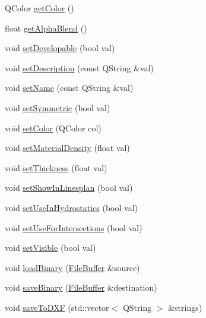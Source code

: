 \begin{DoxyCompactItemize}
Q\-Color \hyperlink{classShipCAD_1_1SubdivisionLayer_a0a4de50721580a29c716e11196239578}{get\-Color} ()
\item 
float \hyperlink{classShipCAD_1_1SubdivisionLayer_a892f5e7c6638537e1a30630fc1a791a2}{get\-Alpha\-Blend} ()
\item 
void \hyperlink{classShipCAD_1_1SubdivisionLayer_a6fdfc0d208904d821349eb7380a52411}{set\-Developable} (bool val)
\item 
void \hyperlink{classShipCAD_1_1SubdivisionLayer_a6ef8702f5488a9c3c3763e8472c9a568}{set\-Description} (const Q\-String \&val)
\item 
void \hyperlink{classShipCAD_1_1SubdivisionLayer_a3861c77aeb283fbea6efe943ced83f41}{set\-Name} (const Q\-String \&val)
\item 
void \hyperlink{classShipCAD_1_1SubdivisionLayer_ab3c7c5072ba6cd411404651e8e0dca2f}{set\-Symmetric} (bool val)
\item 
void \hyperlink{classShipCAD_1_1SubdivisionLayer_a5494031433242c810e6e307bfef33e6d}{set\-Color} (Q\-Color col)
\item 
void \hyperlink{classShipCAD_1_1SubdivisionLayer_ae96292d06a3578f9c7bfbbdec342068a}{set\-Material\-Density} (float val)
\item 
void \hyperlink{classShipCAD_1_1SubdivisionLayer_ac4068bcc8287698ee23e27246de9212b}{set\-Thickness} (float val)
\item 
void \hyperlink{classShipCAD_1_1SubdivisionLayer_aa58323da0043db61eaa87672755e96d2}{set\-Show\-In\-Linesplan} (bool val)
\item 
void \hyperlink{classShipCAD_1_1SubdivisionLayer_a88897eeb2b600169ca110fc4ec4aef08}{set\-Use\-In\-Hydrostatics} (bool val)
\item 
void \hyperlink{classShipCAD_1_1SubdivisionLayer_aef63325b0ef8b700b96a7cd97c501936}{set\-Use\-For\-Intersections} (bool val)
\item 
void \hyperlink{classShipCAD_1_1SubdivisionLayer_a979723de5c5cf0f4ecea8a5f9d0968d7}{set\-Visible} (bool val)
\item 
void \hyperlink{classShipCAD_1_1SubdivisionLayer_a060357b84c0549fa7310e45680fed9bd}{load\-Binary} (\hyperlink{classShipCAD_1_1FileBuffer}{File\-Buffer} \&source)
\item 
void \hyperlink{classShipCAD_1_1SubdivisionLayer_a35b72f27a1d354dcc6f3b844687d91e8}{save\-Binary} (\hyperlink{classShipCAD_1_1FileBuffer}{File\-Buffer} \&destination)
\item 
void \hyperlink{classShipCAD_1_1SubdivisionLayer_aafdd381a2cf13c0f37072b6c3f008b05}{save\-To\-D\-X\-F} (std\-::vector$<$ Q\-String $>$ \&strings)

\end{DoxyCompactItemize}
